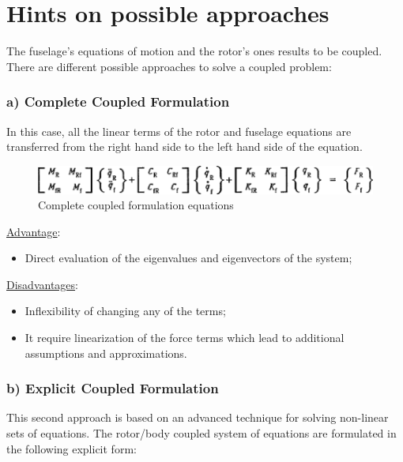 \clearpage
\section*{Hints on possible approaches}
\noindent
The fuselage's equations of motion and the rotor's ones results to be coupled. \\
There are different possible approaches to solve a coupled problem:

\medskip
\subsubsection*{a) Complete Coupled Formulation}
\noindent
In this case, all the linear terms of the rotor and fuselage equations are transferred from the right hand side to the left hand side of the equation.

\smallskip
\begin{figure}[h]
	\begin{center}
		\centering  		 		
		\includegraphics[width=0.9\linewidth]{PICTURES/3b_coupling/eq_1.png}
	\end{center}
	\caption {Complete coupled formulation equations}
\end{figure}


\underline{Advantage}: 
\begin{itemize}
	\item Direct evaluation of the eigenvalues and eigenvectors of the system;
\end{itemize}



\underline{Disadvantages}: 
\begin{itemize}
	\item Inflexibility of changing any of the terms;
	\item It require linearization of the force terms which lead to additional assumptions and approximations.
\end{itemize}

\medskip
\subsubsection*{b) Explicit Coupled Formulation}
\noindent
This second approach is based on an advanced technique for solving non-linear sets of equations. The rotor/body coupled system of equations are formulated in the following explicit form:

